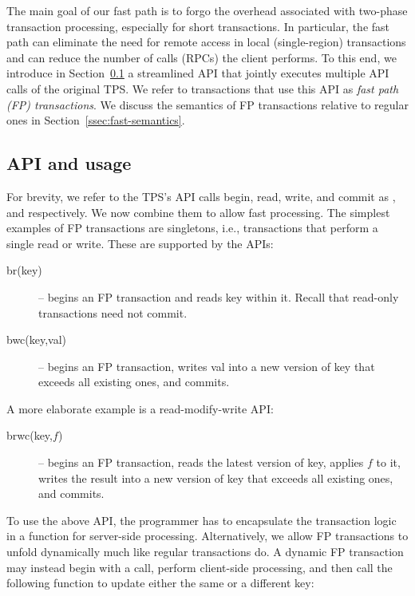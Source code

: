 

The main goal of our fast path  is to forgo the overhead associated with two-phase transaction processing, especially for short transactions.
In particular, the fast path can eliminate the need for remote access in local (single-region) transactions and can reduce the number of 
calls (RPCs) the client performs.
To this end, we introduce in Section~\ref{ssec:fast-api} a streamlined API that jointly executes multiple API calls of the original TPS. 
We refer to transactions that use this API as \emph{fast path (FP) transactions}.
We discuss the semantics of FP transactions relative to regular ones in Section~\ref{ssec:fast-semantics}.

\subsection{API and usage}
\label{ssec:fast-api}

For brevity, we refer to the TPS's API calls  begin, read, write, and commit as , and  respectively. 
We now combine them to allow fast processing.
The simplest examples of FP transactions are singletons, i.e., transactions that perform a single
read or write. These are supported by the APIs:
\begin{description}
\item[br(key)] -- begins an FP transaction and reads key within it. Recall that read-only transactions need not commit. 
\item[bwc(key,val)] -- begins an FP transaction,  writes val into a new version of key that exceeds all existing ones, and commits.
\end{description}

A more elaborate example is a read-modify-write API: 
\begin{description}
\item[brwc(key,$f$)] -- begins an FP transaction,  reads the latest version of key, applies $f$ to it, 
	writes the result into a new version of key that exceeds all existing ones, and commits.
\end{description}

To use the above API, the programmer has to encapsulate the transaction logic in a function for server-side processing. 
Alternatively, we allow FP transactions to unfold dynamically much like regular  transactions do.
A dynamic FP transaction may instead begin with a  call, perform client-side processing, and then call the following
function to update either the same or a different key: 

